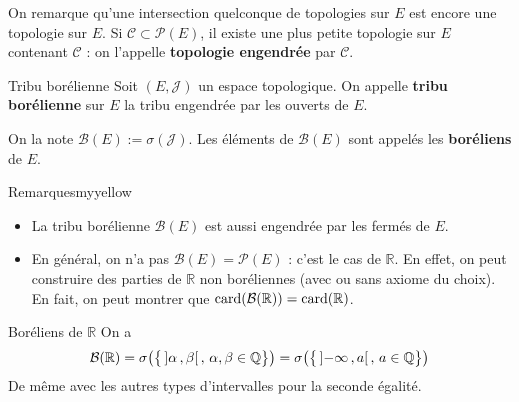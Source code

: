     On remarque qu’une intersection quelconque de topologies sur $E$ est encore une topologie sur $E$. Si $\mathcal{C} \subset \mathcal{P}(E)$, il existe une plus petite topologie sur $E$ contenant $\mathcal{C}$ : on l’appelle \textbf{topologie engendrée} par $\mathcal{C}$.

    \begin{defi}{Tribu borélienne}{}
        Soit $(E,\mathcal{J})$ un espace topologique. On appelle \textbf{tribu borélienne} sur $E$ la tribu engendrée par les ouverts de $E$. 

        On la note $\mathcal{B}(E) := \sigma(\mathcal{J})$. Les éléments de $\mathcal{B}(E)$ sont appelés les \textbf{boréliens} de $E$.
    \end{defi}

    \begin{omed}{Remarques}{myyellow}
        \begin{itemize}
            \item La tribu borélienne $\mathcal{B}(E)$ est aussi engendrée par les fermés de $E$.
            \item En général, on n’a pas $\mathcal{B}(E) = \mathcal{P}(E)$ : c’est le cas de $\mathbb{R}$. En effet, on peut construire des parties de $\mathbb{R}$ non boréliennes (avec ou sans axiome du choix). En fait, on peut montrer que $\operatorname{card}(\mathcal{B}(\mathbb{R})) = \operatorname{card}(\mathbb{R})$.
        \end{itemize}
    \end{omed}

    \begin{prop}{Boréliens de $\mathbb{R}$}{}
        On a 
        \[ \mathcal{B}(\mathbb{R}) = \sigma\big(\big\{ \left] \alpha \, , \beta \right[, \, \alpha, \beta \in \mathbb{Q} \big\}\big) = \sigma\big(\big\{ \left] -\infty \, , a \right[, \, a \in \mathbb{Q} \big\}\big) \]   
        De même avec les autres types d’intervalles pour la seconde égalité.
    \end{prop}

